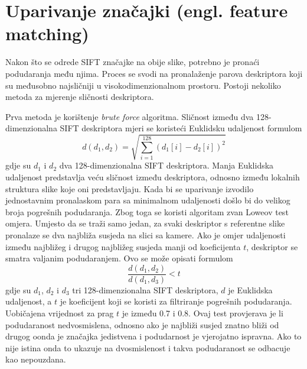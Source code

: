 \section{Uparivanje značajki (engl. feature matching)}

Nakon što se odrede SIFT značajke na obije slike, potrebno je pronaći podudaranja među njima. Proces se svodi na pronalaženje parova deskriptora koji su međusobno najsličniji u visokodimenzionalnom prostoru. Postoji nekoliko metoda za mjerenje sličnosti deskriptora.

Prva metoda je korištenje \textit{brute force} algoritma. Sličnost između dva 128-dimenzionalna SIFT deskriptora mjeri se koristeći Euklidsku udaljenost formulom
\begin{equation}
    d(d_1, d_2) = \sqrt{\sum_{i=1}^{128} (d_1[i] - d_2[i])^2}
\end{equation}
gdje su $d_1$ i $d_2$ dva 128-dimenzionalna SIFT deskriptora. Manja Euklidska udaljenost predstavlja veću sličnost između deskriptora, odnosno između lokalnih struktura slike koje oni predstavljaju.
Kada bi se uparivanje izvodilo jednostavnim pronalaskom para sa minimalnom udaljenosti došlo bi do velikog broja pogrešnih podudaranja. Zbog toga se koristi algoritam zvan Loweov test omjera. Umjesto da se traži samo jedan, za svaki deskriptor s referentne slike pronalaze se dva najbliža susjeda na slici sa kamere. Ako je omjer udaljenosti između najbližeg i drugog najbližeg susjeda manji od koeficijenta $t$, deskriptor se smatra valjanim podudaranjem. Ovo se može opisati formulom
\begin{equation}
    \frac{d(d_1, d_2)}{d(d_1, d_3)} < t
\end{equation}
gdje su $d_1$, $d_2$ i $d_3$ tri 128-dimenzionalna SIFT deskriptora, $d$ je Euklidska udaljenost, a $t$ je koeficijent koji se koristi za filtriranje pogrešnih podudaranja. Uobičajena vrijednost za prag $t$ je između 0.7 i 0.8. Ovaj test provjerava je li podudaranost nedvosmislena, odnosno ako je najbliži susjed znatno bliži od drugog oonda je značajka jedistvena i podudarnost je vjerojatno ispravna. Ako to nije istina onda to ukazuje na dvosmislenost i takva podudaranost se odbacuje kao nepouzdana.

